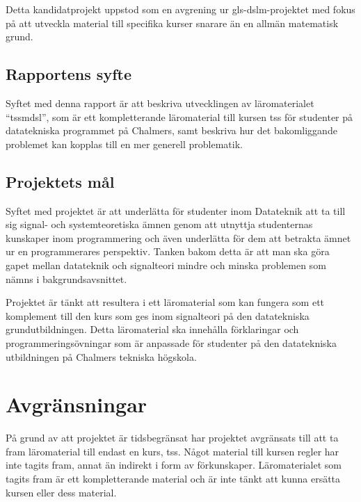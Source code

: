 \documentclass[12pt,a4paper,twoside,openright]{article}
\begin{document}
Detta kandidatprojekt uppstod som en avgrening ur
\gls{gls-dslm}-projektet med fokus på att utveckla material till
specifika kurser snarare än en allmän matematisk grund.

\subsection{Rapportens syfte}


Syftet med denna rapport är att beskriva utvecklingen av
läromaterialet ``\gls{tssmdsl}'', som är ett kompletterande
läromaterial till kursen \gls{tss} för studenter på datatekniska
programmet på Chalmers, samt beskriva hur det bakomliggande problemet
kan kopplas till en mer generell problematik.

\subsection{Projektets mål}
Syftet med projektet är att underlätta för studenter inom Datateknik
att ta till sig signal- och systemteoretiska ämnen genom att utnyttja
studenternas kunskaper inom programmering och även underlätta för dem
att betrakta ämnet ur en programmerares perspektiv. Tanken bakom detta
är att man ska göra gapet mellan datateknik och signalteori mindre och
minska problemen som nämns i bakgrundsavsnittet.

Projektet är tänkt att resultera i ett läromaterial som kan fungera
som ett komplement till den kurs som ges inom signalteori på den
datatekniska grund\-utbildningen. Detta läromaterial ska innehålla
förklaringar och programmeringsövningar som är anpassade för studenter
på den datatekniska utbildningen på Chalmers tekniska högskola.

\newpage

\section{Avgränsningar}
\label{sec:avgrans}
På grund av att projektet är tidsbegränsat har projektet avgränsats
till att ta fram läromaterial till endast en kurs,
\gls{tss}. Något material till kursen \gls{regler} har inte tagits fram,
annat än indirekt i form av förkunskaper. Läromaterialet som tagits
fram är ett kompletterande
material och är inte tänkt att kunna ersätta kursen eller dess
material.
\end{document}
